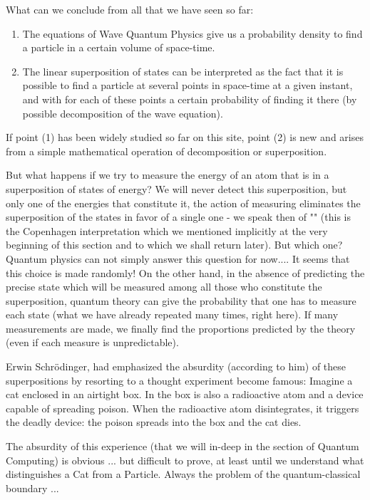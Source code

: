 	What can we conclude from all that we have seen so far:
	\begin{enumerate}
		\item The equations of Wave Quantum Physics give us a probability density to find a particle in a certain volume of space-time.

		\item The linear superposition of states can be interpreted as the fact that it is possible to find a particle at several points in space-time at a given instant, and with for each of these points a certain probability of finding it there (by possible decomposition of the wave equation).
	\end{enumerate}
	If point (1) has been widely studied so far on this site, point (2) is new and arises from a simple mathematical operation of decomposition or superposition.
	
	But what happens if we try to measure the energy of an atom that is in a superposition of states of energy? We will never detect this superposition, but only one of the energies that constitute it, the action of measuring eliminates the superposition of the states in favor of a single one - we speak then of "" (this is the Copenhagen interpretation which we mentioned implicitly at the very beginning of this section and to which we shall return later). But which one? Quantum physics can not simply answer this question for now.... It seems that this choice is made randomly! On the other hand, in the absence of predicting the precise state which will be measured among all those who constitute the superposition, quantum theory can give the probability that one has to measure each state (what we have already repeated many times, right here). If many measurements are made, we finally find the proportions predicted by the theory (even if each measure is unpredictable).
	
	Erwin Schrödinger, had emphasized the absurdity (according to him) of these superpositions by resorting to a thought experiment become famous: Imagine a cat enclosed in an airtight box. In the box is also a radioactive atom and a device capable of spreading poison. When the radioactive atom disintegrates, it triggers the deadly device: the poison spreads into the box and the cat dies.
	
	The absurdity of this experience (that we will in-deep in the section of Quantum Computing) is obvious ... but difficult to prove, at least until we understand what distinguishes a Cat from a Particle. Always the problem of the quantum-classical boundary ...

